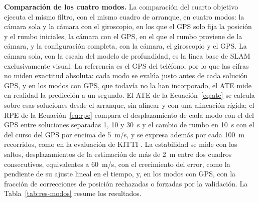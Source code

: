\textbf{Comparación de los cuatro modos.}
La comparación del cuarto objetivo ejecuta el mismo filtro, con el mismo cuadro de arranque, en cuatro modos: la cámara sola y la cámara con el giroscopio, en los que el GPS solo fija la posición y el rumbo iniciales, la cámara con el GPS, en el que el rumbo proviene de la cámara, y la configuración completa, con la cámara, el giroscopio y el GPS.
La cámara sola, con la escala del modelo de profundidad, es la línea base de SLAM exclusivamente visual.
La referencia es el GPS del teléfono, por lo que las cifras no miden exactitud absoluta: cada modo se evalúa justo antes de cada solución GPS, y en los modos con GPS, que todavía no la han incorporado, el ATE mide en realidad la predicción a un segundo.
El ATE de la Ecuación~\eqref{eq:ate} se calcula sobre esas soluciones desde el arranque, sin alinear y con una alineación rígida; el RPE de la Ecuación~\eqref{eq:rpe} compara el desplazamiento de cada modo con el del GPS entre soluciones separadas 1, 10 y 30~s y el cambio de rumbo en 10~s con el del curso del GPS por encima de 5~m/s, y se expresa además por cada 100~m recorridos, como en la evaluación de KITTI \cite{geiger2012kitti}.
La estabilidad se mide con los saltos, desplazamientos de la estimación de más de 2~m entre dos cuadros consecutivos, equivalentes a 60~m/s, con el crecimiento del error, como la pendiente de su ajuste lineal en el tiempo, y, en los modos con GPS, con la fracción de correcciones de posición rechazadas o forzadas por la validación.
La Tabla~\ref{tab:res-modos} resume los resultados.

